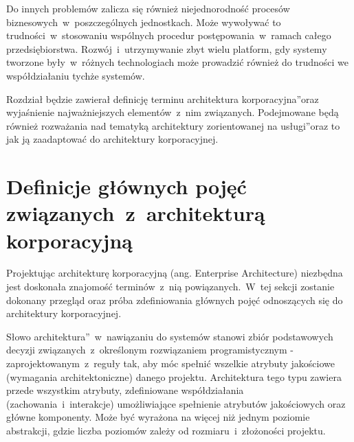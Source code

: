 Do innych problemów zalicza się również niejednorodność procesów biznesowych~w~poszczególnych jednostkach. Może wywoływać to trudności~w~stosowaniu wspólnych procedur postępowania~w~ramach całego przedsiębiorstwa. Rozwój~i~utrzymywanie zbyt wielu platform, gdy systemy tworzone były~w~różnych technologiach może prowadzić również do trudności we współdziałaniu tychże systemów.

Rozdział będzie zawierał definicję terminu \quotedblbase architektura korporacyjna\textquotedblright oraz wyjaśnienie najważniejszych elementów~z~nim związanych. Podejmowane będą również rozważania nad tematyką \quotedblbase architektury zorientowanej na usługi\textquotedblright oraz to jak ją zaadaptować do architektury korporacyjnej.

\section{Definicje głównych pojęć związanych~z~architekturą korporacyjną}
Projektując architekturę korporacyjną (ang. Enterprise Architecture) niezbędna jest doskonała znajomość terminów~z~nią powiązanych.~W~tej sekcji zostanie dokonany przegląd oraz próba zdefiniowania głównych pojęć odnoszących się do architektury korporacyjnej.

Słowo \quotedblbase architektura\textquotedblright~w~nawiązaniu do systemów stanowi zbiór podstawowych decyzji związanych~z~określonym rozwiązaniem programistycznym  - zaprojektowanym~z~reguły tak, aby móc spełnić wszelkie atrybuty jakościowe (wymagania architektoniczne) danego projektu. Architektura tego typu zawiera przede wszystkim atrybuty, zdefiniowane współdziałania (zachowania~i~interakcje) umożliwiające spełnienie atrybutów jakościowych oraz główne komponenty.  Może być wyrażona na więcej niż jednym poziomie abstrakcji, gdzie liczba poziomów zależy od rozmiaru~i~złożoności projektu. 


